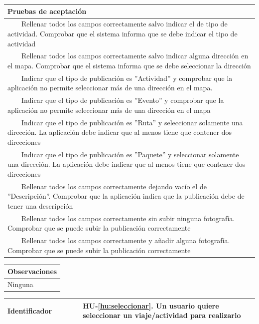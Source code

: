 \documentclass[11pt]{article}
\newcommand{\tabitem}{~~\llap{\textbullet}~~}
\begin{document}
  \begin{longtable}{p{1.028\linewidth}}
    \textbf{Pruebas de aceptación}\\
    \midrule
    \tabitem Rellenar todos los campos correctamente salvo indicar el de tipo de actividad. Comprobar que el sistema informa que se debe indicar el tipo de actividad\\
    \tabitem Rellenar todos los campos correctamente salvo indicar alguna dirección en el mapa. Comprobar que el sistema informa que se debe seleccionar la dirección\\
    \tabitem Indicar que el tipo de publicación es ''Actividad'' y comprobar que la aplicación no permite seleccionar  más de una dirección en el mapa.\\
    \tabitem Indicar que el tipo de publicación es ''Evento'' y comprobar que la aplicación no permite seleccionar  más de una dirección en el mapa\\
    \tabitem Indicar que el tipo de publicación es ''Ruta'' y seleccionar solamente una dirección. La aplicación debe indicar que al menos tiene que contener dos direcciones\\
    \tabitem Indicar que el tipo de publicación es ''Paquete'' y seleccionar solamente una dirección. La aplicación debe indicar que al menos tiene que contener dos direcciones\\
    \tabitem Rellenar todos los campos correctamente dejando vacío el de ''Descripción''. Comprobar que la aplicación indica que la publicación debe de tener una descripción\\
    \tabitem Rellenar todos los campos correctamente sin subir ninguna fotografía. Comprobar que se puede subir la publicación correctamente\\
    \tabitem Rellenar todos los campos correctamente y añadir alguna fotografía. Comprobar que se puede subir la publicación correctamente\\
\end{longtable}
\begin{longtable}{p{1.028\linewidth}}
  \textbf{Observaciones}\\
  \midrule
  Ninguna\\
  \bottomrule
  \bottomrule
\end{longtable}



  \centering
  \begin{longtable}{p{0.3\linewidth}|p{0.7\linewidth}}
    \toprule
    \toprule
    \textbf{Identificador} & \textbf{HU-\ref{hu:seleccionar}}. Un usuario quiere seleccionar un viaje/actividad para realizarlo\\
    
    \bottomrule
  \end{longtable}
\end{document}
